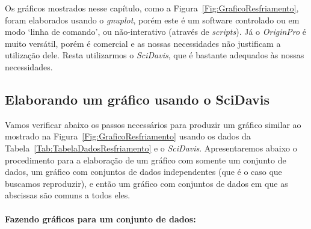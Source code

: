     Os gráficos mostrados nesse capítulo, como a Figura~\ref{Fig:GraficoResfriamento}, foram elaborados usando o \emph{gnuplot}, porém este é um software controlado ou em modo `linha de comando', ou não-interativo (através de \emph{scripts}). Já o \emph{OriginPro} é muito versátil, porém é comercial e as nossas necessidades não justificam a utilização dele. Resta utilizarmos o \emph{SciDavis}, que é bastante adequados às nossas necessidades.
    
\subsection{Elaborando um gráfico usando o SciDavis}

Vamos verificar abaixo os passos necessários para produzir um gráfico similar ao mostrado na Figura~\ref{Fig:GraficoResfriamento} usando os dados da Tabela~\ref{Tab:TabelaDadosResfriamento} e o \emph{SciDavis}. Apresentaremos abaixo o procedimento para a elaboração de um gráfico com somente um conjunto de dados, um gráfico com conjuntos de dados independentes (que é o caso que buscamos reproduzir), e então um gráfico com conjuntos de dados em que as abscissas são comuns a todos eles.

\paragraph{Fazendo gráficos para um conjunto de dados:}

